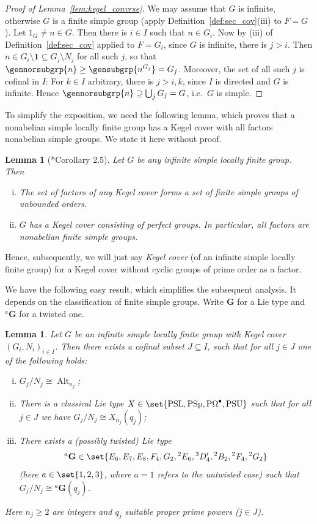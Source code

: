 \documentclass[a4paper,12pt]{amsproc}
\DeclareMathOperator{\PSU}{PSU}%
\DeclareMathOperator{\PSL}{PSL}%
\DeclareMathOperator{\PSp}{PSp}%
\DeclareMathOperator{\POmega}{P\Omega}%
\DeclareMathOperator{\Alt}{Alt}%
\theoremstyle{plain}
\newtheorem{lemma}[definition]{Lemma}
\theoremstyle{definition}
\begin{document}
\begin{proof}[Proof of Lemma~\ref{lem:kegel_convrse}]
We may assume that $G$ is infinite, otherwise $G$ is a finite simple group (apply Definition~\ref{def:sec_cov}(iii) to $F=G$). Let $1_G\neq n\in G$. Then there is $i\in I$ such that $n\in G_i$. Now by (iii) of Definition~\ref{def:sec_cov} applied to $F=G_i$, since $G$ is infinite, there is $j>i$. Then $n\in G_i\setminus\mathbf{1}\subseteq G_j\setminus N_j$ for all such $j$, so that $\gennorsubgrp{n}\geq\gensubgrp{n^{G_j}}=G_j$. Moreover, the set of all such $j$ is cofinal in $I$: For $k\in I$ arbitrary, there is $j>i,k$, since $I$ is directed and $G$ is infinite. Hence $\gennorsubgrp{n}\supseteq\bigcup_{j}G_j=G$, i.e.\ $G$ is simple.
\end{proof}
	
To simplify the exposition, we need the following lemma, which proves that a nonabelian simple locally finite group has a Kegel cover with all factors nonabelian simple groups. We state it here without proof.
	
\begin{lemma}[\cite{hartley1995simple}*{Corollary 2.5}] Let $G$ be any infinite simple locally finite group. Then \begin{enumerate}[(i)]
\item The set of factors of any Kegel cover forms a set of finite simple groups of unbounded orders.
\item $G$ has a Kegel cover consisting of perfect groups. In particular, all factors are nonabelian finite simple groups. 
\end{enumerate}
\end{lemma}

Hence, subsequently, we will just say \emph{Kegel cover} (of an infinite simple locally finite group) for a Kegel cover without cyclic groups of prime order as a factor. 

We have the following easy result, which simplifies the subsequent analysis. It depends on the classification of finite simple groups. Write $\mathbf{G}$ for a Lie type and ${}^a\mathbf{G}$ for a twisted one.

\begin{lemma}\label{lem:red_one_ltype}
Let $G$ be an infinite simple locally finite group with Kegel cover $(G_i,N_i)_{i\in I}$. Then there exists a cofinal subset $J\subseteq I$, such that for all $j\in J$ one of the following holds:
\begin{enumerate}[(i)]
\item $G_j/N_j\cong \Alt_{n_j}$;
\item There is a classical Lie type $X\in\set{\PSL,\PSp,\POmega^\bullet,\PSU}$ such that for all $j\in J$ we have $G_j/N_j\cong X_{n_j}(q_j)$;
\item There exists a (possibly twisted) Lie type 
$$
{}^a\mathbf{G}\in\set{E_6,E_7,E_8,F_4,G_2,{}^2E_6,{}^3D_4',{}^2B_2,{}^2F_4,{}^2G_2}
$$ 
(here $a\in\set{1,2,3}$, where $a=1$ refers to the untwisted case) such that $G_j/N_j\cong{}^a\mathbf{G}(q_j)$.
\end{enumerate}
Here $n_j\geq 2$ are integers and $q_j$ suitable proper prime powers ($j\in J$).
\end{lemma}
\end{document}
